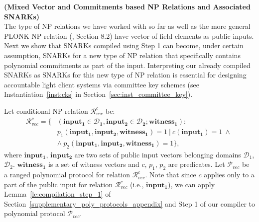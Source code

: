 \noindent \textbf{(Mixed Vector and Commitments based NP Relations and Associated SNARKs)} \\

\noindent The type of NP relations we have worked with so far as well as the more general PLONK NP relation 
(\cite{plonk}, Section 8.2) have vector of field elements as public inputs. Next we show that SNARKs 
compiled using Step 1 can become, under certain assumption, SNARKs for a new type of NP relation 
that specifically contains polynomial commitments as part of the input. Interpreting 
our already compiled SNARKs as SNARKs for this new type of NP relation is essential for designing 
accountable light client systems via committee key schemes (see Instantiation~\ref{inst:cks} 
in Section~\ref{sec:inst_committee_key}).  

\noindent Let conditional NP relation $\mathcal{R}_{\mathit{vec}}^c$  be:
\begin{align*}
\mathcal{R}_{\mathit{vec}}^c = \{&(\mathbf{input_1} \in \mathbf{\mathcal{D}_1}, \mathbf{input_2} \in\mathbf{\mathcal{D}_2}; \mathbf{witness_1}): \\  
&p_1(\mathbf{input_1}, \mathbf{input_2}, \mathbf{witness_1}) = 1 \ | \ c(\mathbf{input_1}) = 1 \ \wedge\ \\
&\wedge \ p_2(\mathbf{input_1}, \mathbf{input_2}, \mathbf{witness_1}) = 1 \},
\end{align*}
\noindent where $\mathbf{input_1}$, $\mathbf{input_2}$ are two sets of public input vectors 
belonging domains  $\mathcal{D}_1$, $\mathcal{D}_2$. $\mathbf{witness_1}$ is a set of witness vectors and $c$, $p_1$, $p_2$ are predicates. 
Let $\mathscr{P}_{\mathit{vec}}$ be a ranged polynomial protocol for relation $\mathcal{R}_{\mathit{vec}}^c$. Note that since $c$ applies 
only to a part of the public input for relation $\mathcal{R}_{\mathit{vec}}^c$ 
(i.e., $\mathbf{input_1}$), we can apply Lemma~\ref{le:compilation_step_1} of Section~\ref{supplementary_poly_protocols_appendix} and Step 1 
of our compiler to polynomial protocol $\mathscr{P}_{\mathit{vec}}$. \\

